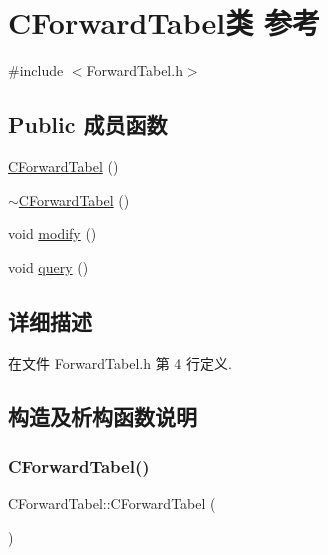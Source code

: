 \hypertarget{class_c_forward_tabel}{}\section{C\+Forward\+Tabel类 参考}
\label{class_c_forward_tabel}


{\ttfamily \#include $<$Forward\+Tabel.\+h$>$}

\subsection*{Public 成员函数}
\begin{DoxyCompactItemize}
\item 
\hyperlink{class_c_forward_tabel_a76fed3d18867dba0bcee9e7d14c90d6b}{C\+Forward\+Tabel} ()
\item 
\hyperlink{class_c_forward_tabel_a593b0557d10c619e95110ee0997d01fe}{$\sim$\+C\+Forward\+Tabel} ()
\item 
void \hyperlink{class_c_forward_tabel_afbc987ef5b55ab2fbc21721d47d623ad}{modify} ()
\item 
void \hyperlink{class_c_forward_tabel_a90efc1b05feb38559334c371a8e83019}{query} ()
\end{DoxyCompactItemize}


\subsection{详细描述}


在文件 Forward\+Tabel.\+h 第 4 行定义.



\subsection{构造及析构函数说明}
\mbox{\label{class_c_forward_tabel_a76fed3d18867dba0bcee9e7d14c90d6b}} 
\subsubsection{\texorpdfstring{C\+Forward\+Tabel()}{CForwardTabel()}}
{\footnotesize\ttfamily C\+Forward\+Tabel\+::\+C\+Forward\+Tabel (\begin{DoxyParamCaption}{ }\end{DoxyParamCaption})}



